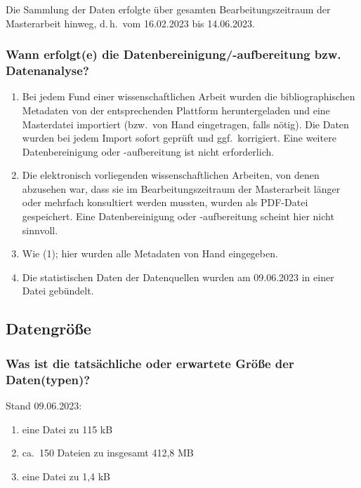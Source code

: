\documentclass[%
  11pt,
  DIV=16,
  a4paper,
  BCOR=15mm,
  twoside=on,
  bibliography=totoc,
  headings=normal,
  numbers=noendperiod,
]{scrartcl}
\begin{document}
Die Sammlung der Daten erfolgte über gesamten Bearbeitungszeitraum der Masterarbeit hinweg, d.\,h.\ vom 16.02.2023 bis 14.06.2023.

\subsubsection{Wann erfolgt(e) die Datenbereinigung/-aufbereitung bzw. Datenanalyse?}

\begin{enumerate}[(1)]
  \item
    Bei jedem Fund einer wissenschaftlichen Arbeit wurden die bibliographischen Metadaten von der entsprechenden Plattform heruntergeladen
    und eine Masterdatei importiert (bzw.\ von Hand eingetragen, falls nötig). Die Daten wurden bei jedem Import sofort geprüft und ggf.\
    korrigiert. Eine weitere Datenbereinigung oder -aufbereitung ist nicht erforderlich.
  \item
    Die elektronisch vorliegenden wissenschaftlichen Arbeiten, von denen abzusehen war, dass sie im Bearbeitungszeitraum der Masterarbeit
    länger oder mehrfach konsultiert werden mussten, wurden als PDF-Datei gespeichert.
    Eine Datenbereinigung oder -aufbereitung scheint hier nicht sinnvoll.
  \item
    Wie (1); hier wurden alle Metadaten von Hand eingegeben.
  \item
    Die statistischen Daten der Datenquellen wurden am 09.06.2023 in einer Datei gebündelt.
\end{enumerate}

\subsection{Datengröße}

\subsubsection{Was ist die tatsächliche oder erwartete Größe der Daten(typen)?}

Stand 09.06.2023:
%
\begin{enumerate}[(1)]
  \item
    eine Datei zu 115 kB
  \item
    ca.\ 150 Dateien zu insgesamt 412,8 MB
  \item
    eine Datei zu 1,4 kB
\end{enumerate}
\end{document}
